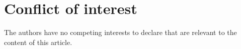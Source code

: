 \documentclass[smallextended,natbib]{svjour3}       %
\numberwithin{definition}{section}
\numberwithin{theorem}{section}
\numberwithin{proposition}{section}
\begin{document}
\color{black}




%
 \section*{Conflict of interest}
The authors have no competing interests to declare that are relevant to the content of this article.
%










\end{document}
